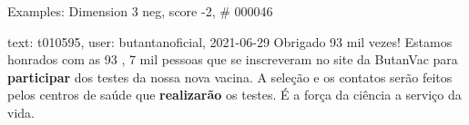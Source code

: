 \begin{frame}{Examples: Dimension 3 neg, score -2, \# 000046}
\footnotesize
\begin{alertblock}{text: t010595, user: butantanoficial, 2021-06-29}
Obrigado 93 mil vezes! Estamos honrados com as 93 , 7 mil pessoas que se 
inscreveram no site da ButanVac para \textbf{participar} dos testes da nossa 
nova vacina. A seleção e os contatos serão feitos pelos centros de saúde que 
\textbf{realizarão} os testes. É a força da ciência a serviço da vida. 
\end{alertblock}
\end{frame}
